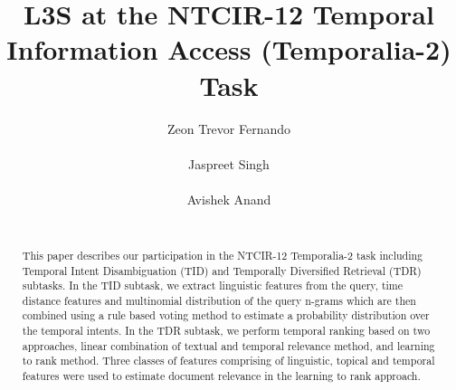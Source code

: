\documentclass{sig-alternate}
\begin{document}
\title{L3S at the NTCIR-12 Temporal Information Access (Temporalia-2) Task}

\author{
%
%
\alignauthor
Zeon Trevor Fernando\\
       \\
\alignauthor
Jaspreet Singh\\
       \\
\alignauthor 
Avishek Anand\\
       \\
}


\maketitle

\begin{abstract}
This paper describes our participation in the NTCIR-12 Temporalia-2 task including Temporal Intent Disambiguation (TID) and Temporally Diversified Retrieval (TDR) subtasks. In the TID subtask, we extract linguistic features from the query, time distance features and multinomial distribution of the query n-grams which are then combined using a rule based voting method to estimate a probability distribution over the temporal intents. In the TDR subtask, we perform temporal ranking based on two approaches, linear combination of textual and temporal relevance method, and learning to rank method. Three classes of features comprising of linguistic, topical and temporal features were used to estimate document relevance in the learning to rank approach.

\end{abstract}
\end{document}

